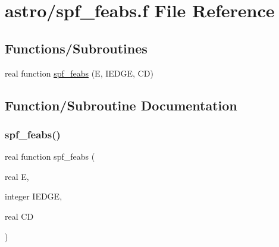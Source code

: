 \hypertarget{spf__feabs_8f}{}\section{astro/spf\+\_\+feabs.f File Reference}
\label{spf__feabs_8f}
\subsection*{Functions/\+Subroutines}
\begin{DoxyCompactItemize}
\item 
real function \hyperlink{spf__feabs_8f_a6dcae8921f62be65363089b12257a1ea}{spf\+\_\+feabs} (E, I\+E\+D\+GE, CD)
\end{DoxyCompactItemize}


\subsection{Function/\+Subroutine Documentation}
\mbox{\label{spf__feabs_8f_a6dcae8921f62be65363089b12257a1ea}} 
\subsubsection{\texorpdfstring{spf\+\_\+feabs()}{spf\_feabs()}}
{\footnotesize\ttfamily real function spf\+\_\+feabs (\begin{DoxyParamCaption}\item[{real}]{E,  }\item[{integer}]{I\+E\+D\+GE,  }\item[{real}]{CD }\end{DoxyParamCaption})}

